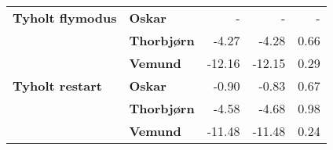 \begin{table}[]
\begin{tabular}{llrrr}
    \textbf{Tyholt flymodus}                & \textbf{Oskar}                       & -                                                                           & -                                                                     & -                                                                            \\
                                            & \textbf{Thorbjørn}                   & -4.27                                                                       & -4.28                                                                 & 0.66                                                                         \\
                                            & \textbf{Vemund}                      & -12.16                                                                      & -12.15                                                                & 0.29                                                                         \\
    \rowcolor[HTML]{C0C0C0} 
    \textbf{Tyholt restart}                 & \textbf{Oskar}                       & -0.90                                                                       & -0.83                                                                 & 0.67                                                                         \\
    \rowcolor[HTML]{C0C0C0} 
                                            & \textbf{Thorbjørn}                   & -4.58                                                                       & -4.68                                                                 & 0.98                                                                         \\
    \rowcolor[HTML]{C0C0C0} 
                                            & \textbf{Vemund}                      & -11.48                                                                      & -11.48                                                                & 0.24                                                                        
    \end{tabular}
\end{table}